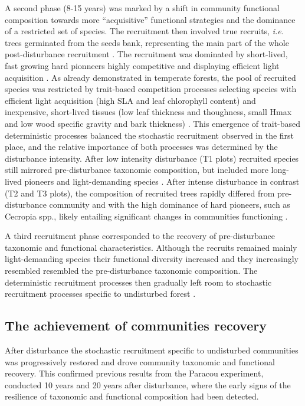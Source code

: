 \documentclass[fleqn,10pt]{ArtEcoFoG} %
\begin{document}
A second phase (8-15 years) was marked by a shift in community
functional composition towards more ``acquisitive'' functional
strategies and the dominance of a restricted set of species. The
recruitment then involved true recruits, \emph{i.e.} trees germinated
from the seeds bank, representing the main part of the whole
post-disturbance recruitment \citep{Lawton1988}. The recruitment was
dominated by short-lived, fast growing hard pionneers highly competitive
and displaying efficient light acquisition
\citep{Wright2004, Chave2009b, Herault2011, Reich2014}. As already
demonstrated in temperate forests, the pool of recruited species was
restricted by trait-based competition processes selecting species with
efficient light acquisition (high SLA and leaf chlorophyll content) and
inexpensive, short-lived tissues (low leaf thickness and thoughness,
small Hmax and low wood specific gravity and bark thickness)
\citep{Chave2004, Mayfield2010, Kunstler2012}. This emergence of
trait-based deterministic processes balanced the stochastic recruitment
observed in the first place, and the relative importance of both
processes was determined by the disturbance intensity. After low
intensity disturbance (T1 plots) recruited species still mirrored
pre-disturbance taxonomic composition, but included more long-lived
pioneers and light-demanding species
\citep{Hubbell1999, Schnitzer2001, Sheil2003, Bongers2009}. After
intense disturbance in contrast (T2 and T3 plots), the composition of
recruited trees rapidly differed from pre-disturbance community and with
the high dominance of hard pioneers, such as Cecropia spp., likely
entailing significant changes in communities functioning
\citep{Diaz2005}.

A third recruitment phase corresponded to the recovery of
pre-disturbance taxonomic and functional characteristics. Although the
recruits remained mainly light-demanding species their functional
diversity increased and they increasingly resembled resembled the
pre-disturbance taxonomic composition. The deterministic recruitment
processes then gradually left room to stochastic recruitment processes
specific to undisturbed forest
\citep{Lawton1988, Chave2004, Mayfield2010}.

\subsection{The achievement of communities
recovery}\label{the-achievement-of-communities-recovery}

After disturbance the stochastic recruitment specific to undisturbed
communities was progressively restored and drove community taxonomic and
functional recovery. This confirmed previous results from the Paracou
experiment, conducted 10 years \citep{Molino2001} and 20 years
\citep{Baraloto2012a} after disturbance, where the early signs of the
resilience of taxonomic and functional composition had been detected.
\end{document}
